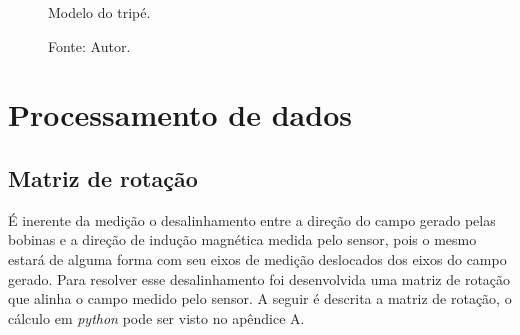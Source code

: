\begin{figure}[H]
    \centering
     \caption{Modelo do tripé.}
     \caption*{Fonte: Autor.}\label{fig:trip}
\end{figure}

\section{Processamento de dados}

\subsection{Matriz de rotação}

É inerente da medição o desalinhamento entre a direção do campo gerado pelas bobinas e a direção de indução magnética medida pelo sensor, pois o mesmo estará de alguma forma com seu eixos de medição deslocados dos eixos do campo gerado. Para resolver esse desalinhamento foi desenvolvida uma matriz de rotação que alinha o campo medido pelo sensor. A seguir é descrita a matriz de rotação, o cálculo em \textit{python} pode ser visto no apêndice A.

